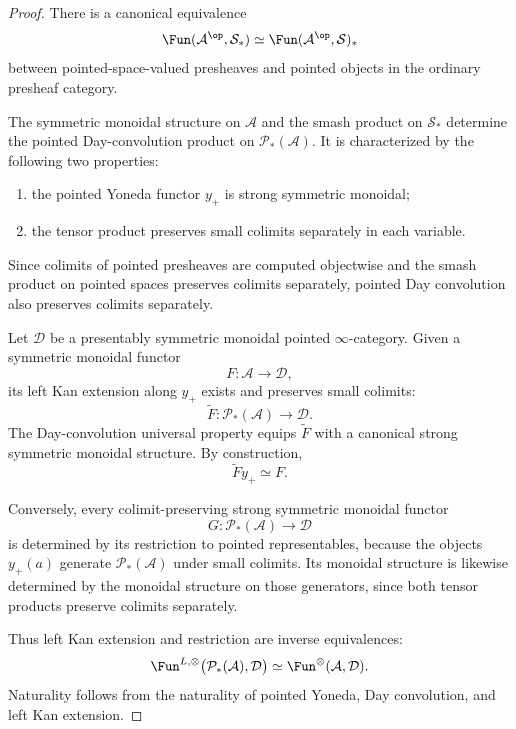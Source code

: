 \begin{proof}
There is a canonical equivalence
\[
    \Fun(\mathcal A^{\op},\mathcal S_*)
    \simeq
    \Fun(\mathcal A^{\op},\mathcal S)_*
\]
between pointed-space-valued presheaves and pointed objects in the ordinary
presheaf category.

The symmetric monoidal structure on \(\mathcal A\) and the smash product on
\(\mathcal S_*\) determine the pointed Day-convolution product on
\(\mathcal P_*(\mathcal A)\).  It is characterized by the following two
properties:
\begin{enumerate}
    \item the pointed Yoneda functor \(y_+\) is strong symmetric monoidal;
    \item the tensor product preserves small colimits separately in each
    variable.
\end{enumerate}
Since colimits of pointed presheaves are computed objectwise and the smash
product on pointed spaces preserves colimits separately, pointed Day
convolution also preserves colimits separately.

Let \(\mathcal D\) be a presentably symmetric monoidal pointed
\(\infty\)-category.  Given a symmetric monoidal functor
\[
    F:
    \mathcal A
    \longrightarrow
    \mathcal D,
\]
its left Kan extension along \(y_+\) exists and preserves small colimits:
\[
    \widetilde F:
    \mathcal P_*(\mathcal A)
    \longrightarrow
    \mathcal D.
\]
The Day-convolution universal property equips \(\widetilde F\) with a
canonical strong symmetric monoidal structure.  By construction,
\[
    \widetilde F y_+
    \simeq
    F.
\]

Conversely, every colimit-preserving strong symmetric monoidal functor
\[
    G:
    \mathcal P_*(\mathcal A)
    \longrightarrow
    \mathcal D
\]
is determined by its restriction to pointed representables, because the
objects \(y_+(a)\) generate \(\mathcal P_*(\mathcal A)\) under small
colimits.  Its monoidal structure is likewise determined by the monoidal
structure on those generators, since both tensor products preserve colimits
separately.

Thus left Kan extension and restriction are inverse equivalences:
\[
    \Fun^{L,\otimes}
    \bigl(
      \mathcal P_*(\mathcal A),
      \mathcal D
    \bigr)
    \simeq
    \Fun^\otimes(\mathcal A,\mathcal D).
\]
Naturality follows from the naturality of pointed Yoneda, Day convolution,
and left Kan extension.
\end{proof}

